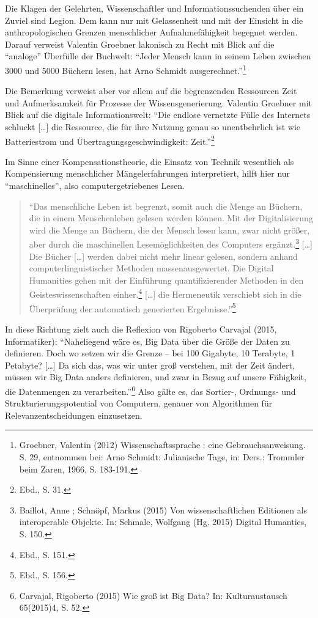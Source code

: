 \documentclass[a4paper,
fontsize=11pt,
oneside,
numbers=noperiodatend,
parskip=half-,
bibliography=totoc,
final
]{scrartcl}
\begin{document}
Die Klagen der Gelehrten, Wissenschaftler und Informationssuchenden über
ein Zuviel sind Legion. Dem kann nur mit Gelassenheit und mit der
Einsicht in die anthropologischen Grenzen menschlicher Aufnahmefähigkeit
begegnet werden. Darauf verweist Valentin Groebner lakonisch zu Recht
mit Blick auf die \enquote{analoge} Überfülle der Buchwelt:
\enquote{Jeder Mensch kann in seinem Leben zwischen 3000 und 5000
Büchern lesen, hat Arno Schmidt ausgerechnet.}\footnote{Groebner,
  Valentin (2012) Wissenschaftssprache : eine Gebrauchsanweisung. S. 29,
  entnommen bei: Arno Schmidt: Julianische Tage, in: Ders.: Trommler
  beim Zaren, 1966, S. 183-191.}

Die Bemerkung verweist aber vor allem auf die begrenzenden Ressourcen
Zeit und Aufmerksamkeit für Prozesse der Wissensgenerierung. Valentin
Groebner mit Blick auf die digitale Informationswelt: \enquote{Die
endlose vernetzte Fülle des Internets schluckt {[}\ldots{}{]} die
Ressource, die für ihre Nutzung genau so unentbehrlich ist wie
Batteriestrom und Übertragungsgeschwindigkeit: Zeit.}\footnote{Ebd., S.
  31.}

Im Sinne einer Kompensationstheorie, die Einsatz von Technik wesentlich
als Kompensierung menschlicher Mängelerfahrungen interpretiert, hilft
hier nur \enquote{maschinelles}, also computergetriebenes Lesen.

\begin{quote}
\enquote{Das menschliche Leben ist begrenzt, somit auch die Menge an
Büchern, die in einem Menschenleben gelesen werden können. Mit der
Digitalisierung wird die Menge an Büchern, die der Mensch lesen kann,
zwar nicht größer, aber durch die maschinellen Lesemöglichkeiten des
Computers ergänzt.\footnote{Baillot, Anne ; Schnöpf, Markus (2015) Von
  wissenschaftlichen Editionen als interoperable Objekte. In: Schmale,
  Wolfgang (Hg. 2015) Digital Humanties, S. 150.} {[}\ldots{}{]} Die
Bücher {[}\ldots{}{]} werden dabei nicht mehr linear gelesen, sondern
anhand computerlinguistischer Methoden massenausgewertet. Die Digital
Humanities gehen mit der Einführung quantifizierender Methoden in den
Geisteswissenschaften einher.\footnote{Ebd., S. 151.} {[}\ldots{}{]} die
Hermeneutik verschiebt sich in die Überprüfung der automatisch
generierten Ergebnisse.}\footnote{Ebd., S. 156.}
\end{quote}

In diese Richtung zielt auch die Reflexion von Rigoberto Carvajal (2015,
Informatiker): \enquote{Naheliegend wäre es, Big Data über die Größe der
Daten zu definieren. Doch wo setzen wir die Grenze -- bei 100 Gigabyte,
10 Terabyte, 1 Petabyte? {[}\ldots{}{]} Da sich das, was wir unter groß
verstehen, mit der Zeit ändert, müssen wir Big Data anders definieren,
und zwar in Bezug auf unsere Fähigkeit, die Datenmengen zu
verarbeiten.}\footnote{Carvajal, Rigoberto (2015) Wie groß ist Big Data?
  In: Kulturaustausch 65(2015)4, S. 52.} Also gälte es, das Sortier-,
Ordnungs- und Strukturierungspotential von Computern, genauer von
Algorithmen für Relevanzentscheidungen einzusetzen.
\end{document}
